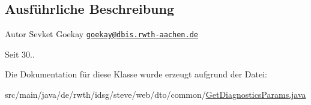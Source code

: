 \subsection{Ausführliche Beschreibung}
\begin{DoxyAuthor}{Autor}
Sevket Goekay \href{mailto:goekay@dbis.rwth-aachen.de}{\tt goekay@dbis.\+rwth-\/aachen.\+de} 
\end{DoxyAuthor}
\begin{DoxySince}{Seit}
30.. 
\end{DoxySince}


Die Dokumentation für diese Klasse wurde erzeugt aufgrund der Datei\+:\begin{DoxyCompactItemize}
\item 
src/main/java/de/rwth/idsg/steve/web/dto/common/\hyperlink{_get_diagnostics_params_8java}{Get\+Diagnostics\+Params.\+java}\end{DoxyCompactItemize}
